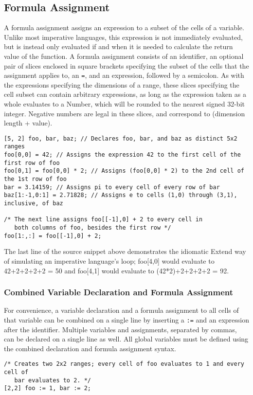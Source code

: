 \subsection{Formula Assignment}
\label{sec:formula}
A formula assignment assigns an expression to a subset of the cells of a variable. Unlike most imperative languages, this expression is not immediately evaluated, but is instead only evaluated if and when it is needed to calculate the return value of the function. A formula assignment consists of an identifier, an optional pair of slices enclosed in square brackets specifying the subset of the cells that the assignment applies to, an \texttt{=}, and an expression, followed by a semicolon. As with the expressions specifying the dimensions of a range, these slices specifying the cell subset can contain arbitrary expressions, as long as the expression taken as a whole evaluates to a Number, which will be rounded to the nearest signed 32-bit integer. Negative numbers are legal in these slices, and correspond to (dimension length + value).
\begin{lstlisting}
[5, 2] foo, bar, baz; // Declares foo, bar, and baz as distinct 5x2 ranges
foo[0,0] = 42; // Assigns the expression 42 to the first cell of the first row of foo
foo[0,1] = foo[0,0] * 2; // Assigns (foo[0,0] * 2) to the 2nd cell of the 1st row of foo
bar = 3.14159; // Assigns pi to every cell of every row of bar
baz[1:-1,0:1] = 2.71828; // Assigns e to cells (1,0) through (3,1), inclusive, of baz

/* The next line assigns foo[[-1],0] + 2 to every cell in
   both columns of foo, besides the first row */
foo[1:,:] = foo[[-1],0] + 2;
\end{lstlisting}
The last line of the source snippet above demonstrates the idiomatic Extend way of simulating an imperative language's loop; foo[4,0] would evaluate to 42+2+2+2+2 = 50 and foo[4,1] would evaluate to (42*2)+2+2+2+2 = 92.
\subsubsection{Combined Variable Declaration and Formula Assignment}
\label{sec:CombinedDeclAsgn}
For convenience, a variable declaration and a formula assignment to all cells of that variable can be combined on a single line by inserting a \texttt{:=} and an expression after the identifier. Multiple variables and assignments, separated by commas, can be declared on a single line as well. All global variables must be defined using the combined declaration and formula assignment syntax.
\begin{lstlisting}
/* Creates two 2x2 ranges; every cell of foo evaluates to 1 and every cell of
   bar evaluates to 2. */
[2,2] foo := 1, bar := 2;
\end{lstlisting}
